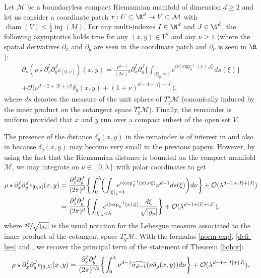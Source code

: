 \begin{prop}\label{can-han} Let $\mathcal{M}$ be a boundaryless compact Riemannian manifold of dimension $d\geq 2$ and let us consider a coordinate patch $\tau:U\subset\R^d\to V\subset\mathcal{M}$ with $\operatorname{diam}(V)\leq \frac{1}{2}\operatorname{inj}(M)$.
For any multi-indexes $I\in \N^{d}$ and $J\in \N^d$, the following asymptotics holds true for any $(x,y)\in V^2$ and any $\nu\geq 1$ (where the spatial derivatives $\partial_x$ and $\partial_y$ are seen in the coordinate patch and $\partial_\nu$ is seen in $\R$):
\begin{multline*}
\partial_\nu (\rho \star \partial_x^I \partial_y^J e_{[0,\nu]})(x,y)=\frac{\nu^{d-1}}{(2\pi)^d} \partial_x^{I} \partial_y^{J} \biggl\{\int_{|\xi|_{y}=1} e^{i \nu\langle \exp_y^{-1}(x),\xi\rangle }ds(\xi)\biggr\}\\
+\mathcal{O}\bigl(\nu^{d-2+|I|+|J|}\delta_g(x,y)+(1+\nu)^{d-3+|I|+|J|} \bigr),
\end{multline*}
where $ds$ denotes the measure of the unit sphere of
$T_y^\star \mathcal{M}$ (canonically induced by the inner product on the cotangent space $T_y^\star\mathcal{M}$). Finally, the remainder is uniform provided that $x$ and $y$ run over a compact subset of the open set $V$.
\end{prop}
The presence of the distance $\delta_g(x,y)$ in the remainder is of interest in \cite{canzani2017c} and also in \cite[Prop.\,10]{canzani2015scaling} because $\delta_g(x,y)$ may become very small in the previous papers. However, by using the fact that the Riemannian distance is bounded on the compact manifold $\mathcal{M}$, we may integrate on $\nu\in [0,\lambda]$ with polar coordinates to get
\begin{align*}
\rho\star \partial_x^I \partial_y^J e_{[0,\lambda]}(x,y)&=\frac{\partial_x^I \partial_y^J}{(2\pi)^d}\biggl\{ \int_{0}^\lambda\! \biggl(\int_{|\xi|_{y}=1}\hspace*{-5mm} e^{i\langle \exp_y^{-1}(x),\nu \xi\rangle} \nu^{d-1} ds(\xi)\biggr) d\nu \biggr\}+\mathcal{O}(\lambda^{d-1+|I|+|J|}) \\
&=\frac{\partial_x^I \partial_y^J}{(2\pi)^d}\biggl\{ \int_{|\xi|_{y}<\lambda}\hspace*{-5mm} e^{i\langle \exp_y^{-1}(x),\xi\rangle} \frac{ d\xi }{\sqrt{|g_y|}} \biggr\}+\mathcal{O}(\lambda^{d-1+|I|+|J|}),
\end{align*}
where $\sfrac{d\xi}{\sqrt{|g_y|}}$ is the usual notation for the Lebesgue measure associated to the inner product of the cotangent space $T_y^\star \mathcal{M}$. With the formulas \eqref{norm-exp}, \eqref{defi-bes} and \cite[lines (8--9)]{canzani2017c}, we recover the principal term of the statement of Theorem \ref{hohor}:
\begin{equation*}
\rho\star \partial_x^I \partial_y^J e_{[0,\lambda]}(x,y)
= \frac{\partial_x^{I}\partial_y^J}{(2\pi)^{\sfrac{d}{2}}}\biggl\{\int_{0}^{\lambda }\nu^{d-1} \widehat{\sigma_{d-1}}(\nu \delta_g(x,y))
d\nu\biggr\} +\mathcal{O}(\lambda^{d-1+|I|+|J|}).
\end{equation*}

